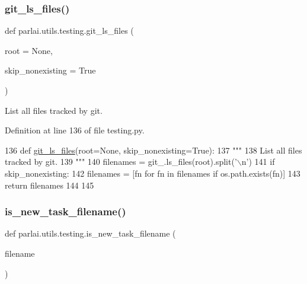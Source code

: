 \subsubsection{\texorpdfstring{git\+\_\+ls\+\_\+files()}{git\_ls\_files()}}
{\footnotesize\ttfamily def parlai.\+utils.\+testing.\+git\+\_\+ls\+\_\+files (\begin{DoxyParamCaption}\item[{}]{root = {\ttfamily None},  }\item[{}]{skip\+\_\+nonexisting = {\ttfamily True} }\end{DoxyParamCaption})}

\begin{DoxyVerb}List all files tracked by git.
\end{DoxyVerb}
 

Definition at line 136 of file testing.\+py.


\begin{DoxyCode}
136 \textcolor{keyword}{def }\hyperlink{namespaceparlai_1_1utils_1_1testing_a50b91b6f209eeedd93ae7ec0e790b121}{git\_ls\_files}(root=None, skip\_nonexisting=True):
137     \textcolor{stringliteral}{"""}
138 \textcolor{stringliteral}{    List all files tracked by git.}
139 \textcolor{stringliteral}{    """}
140     filenames = git\_.ls\_files(root).split(\textcolor{stringliteral}{'\(\backslash\)n'})
141     \textcolor{keywordflow}{if} skip\_nonexisting:
142         filenames = [fn \textcolor{keywordflow}{for} fn \textcolor{keywordflow}{in} filenames \textcolor{keywordflow}{if} os.path.exists(fn)]
143     \textcolor{keywordflow}{return} filenames
144 
145 
\end{DoxyCode}
\mbox{\label{namespaceparlai_1_1utils_1_1testing_a18092382f94848a52ef19248aa39f7ca}} 
\subsubsection{\texorpdfstring{is\+\_\+new\+\_\+task\+\_\+filename()}{is\_new\_task\_filename()}}
{\footnotesize\ttfamily def parlai.\+utils.\+testing.\+is\+\_\+new\+\_\+task\+\_\+filename (\begin{DoxyParamCaption}\item[{}]{filename }\end{DoxyParamCaption})}


